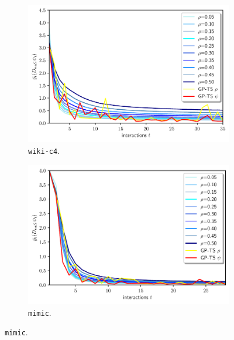 \begin{figure}[!th]
	\centering
	\begin{subfigure}[c]{0.32\textwidth}
		\includegraphics[width=\textwidth]{./figs/wiki_c4_pre_training_loss}
		\vspace*{-4ex}
		\caption{\texttt{wiki-c4}.}
		\label{fig:pretraining_new_wikic4}
	\end{subfigure}
	\begin{subfigure}[c]{0.32\textwidth}
		\includegraphics[width=\textwidth]{./figs/medical_new_pre_training_loss}
		\vspace*{-4ex}
		\caption{\texttt{mimic}.}

\end{subfigure}
\end{figure}
